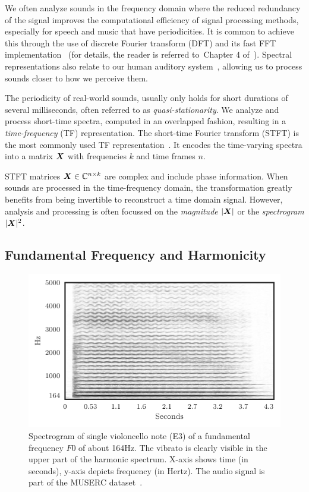 We often analyze sounds in the frequency domain where the reduced redundancy of the signal improves the computational efficiency of signal processing methods, especially for speech and music that have periodicities.
It is common to achieve this through the use of discrete Fourier transform (DFT) and its fast FFT implementation~\cite{cooley65} (for details, the reader is referred to~Chapter 4 of~\cite{proakis96}).
Spectral representations also relate to our human auditory system~\cite{zwicker13, moore89}, allowing us to process sounds closer to how we perceive them.
\par
The periodicity of real-world sounds, usually only holds for short durations of several milliseconds, often referred to as \emph{quasi-stationarity}.
We analyze and process short-time spectra, computed in an overlapped fashion, resulting in a \emph{time-frequency} (TF) representation.
The short-time Fourier transform (STFT) is the most commonly used TF representation~\cite{mcaulay86}.
It encodes the time-varying spectra into a matrix \({\bm{X}}\) with frequencies \(k\) and time frames \(n\).
\par
STFT matrices \({\bm{X}} \in {\mathbb{C}}^{n \times k}\) are complex and include phase information.
When sounds are processed in the time-frequency domain, the transformation greatly benefits from being invertible to reconstruct a time domain signal.
However, analysis and processing is often focussed  on the \emph{magnitude} \(|{\bm{X}}|\) or the \emph{spectrogram} \(|{\bm{X}}|^2\).

\subsection{Fundamental Frequency and Harmonicity}

\begin{figure}[h!]
  \centering
  \includegraphics[width=0.8\columnwidth]{gfx/cello.pdf}
  \caption{Spectrogram of single violoncello note (E3) of a fundamental frequency \(F0\) of about 164\si{\hertz}. The vibrato is clearly visible in the upper part of the harmonic spectrum. X-axis shows time (in seconds), y-axis depicts frequency (in Hertz). The audio signal is part of the MUSERC dataset~\cite{stoeter15acm}.}%
  \label{fig:cello_example}%
\end{figure}

